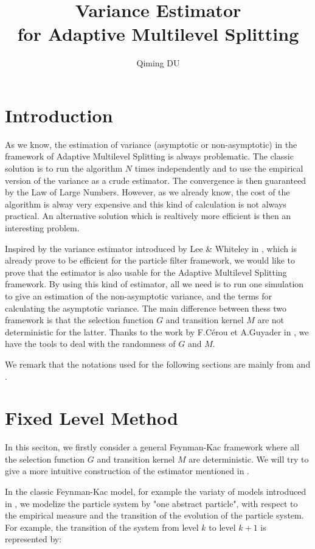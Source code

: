 \documentclass[a4paper,10pt]{article}
\title{Variance Estimator \\for Adaptive Multilevel Splitting}
\author{Qiming DU}
\date{}
\begin{document}
\maketitle
\vspace{3cm}
\section*{Introduction}
As we know, the estimation of variance (asymptotic or non-asymptotic)
in the framework
of Adaptive Multilevel Splitting is always problematic. The classic solution is 
to run the algorithm $N$ times independently and to use the empirical 
version of the variance as a crude estimator.
The convergence is then guaranteed by
the Law of Large Numbers. However, as we already know, the cost of the algorithm 
is alway very expensive and this kind of calculation is not always practical. 
An alternative solution which is realtively more efficient is then 
an interesting problem.

Inspired by the variance estimator introduced by Lee \& Whiteley in \cite{lee2015},
which is already prove to be efficient for the particle filter framework,
we would like to prove that the estimator is also usable for the Adaptive 
Multilevel Splitting framework. By using this kind of estimator, all we need is
to run one simulation to give an estimation of the non-asymptotic variance, and
the terms for calculating the asymptotic variance.
The main difference between thess two framework
is that the selection function $G$ and transition kernel $M$ are not
deterministic
for the latter. Thanks to the work by F.Cérou et A.Guyader in \cite{cerou2014fluctuation}, we have the tools to deal with the randomness of $G$ and $M$.    

We remark that the notations used for the following sections are mainly from \cite{lee2015} and \cite{cerou2014fluctuation}.   

\section{Fixed Level Method}
In this seciton, we firstly consider a general Feynman-Kac framework 
where all the selection function $G$ and transition kernel $M$ are deterministic. We will try to give a more intuitive construction of the estimator mentioned in \cite{lee2015}. 

In the classic Feynman-Kac model, for example the variaty of models introduced
in \cite{del2004feynman}, we modelize the particle system by "one abstract
particle", with respect to the empirical measure and the transition of the evolution of the
particle system. For example, the transition of the system from level $k$ to
level $k+1$ is
represented by:
\end{document}
